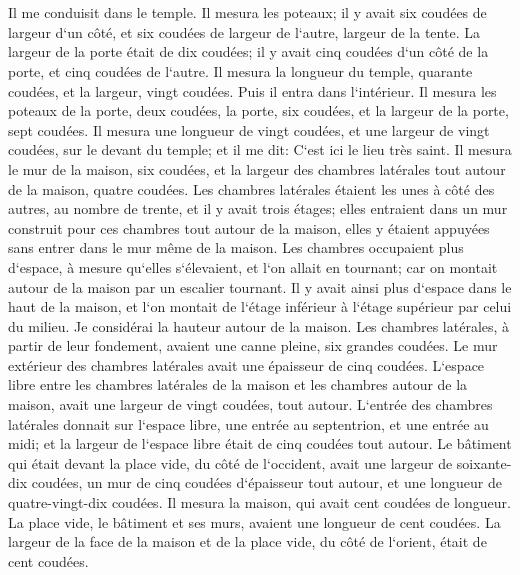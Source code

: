 \chapter{}

\verse Il me conduisit dans le temple. Il mesura les poteaux; il y avait six coudées de largeur d`un côté, et six coudées de largeur de l`autre, largeur de la tente. 
\verse La largeur de la porte était de dix coudées; il y avait cinq coudées d`un côté de la porte, et cinq coudées de l`autre. Il mesura la longueur du temple, quarante coudées, et la largeur, vingt coudées. 
\verse Puis il entra dans l`intérieur. Il mesura les poteaux de la porte, deux coudées, la porte, six coudées, et la largeur de la porte, sept coudées. 
\verse Il mesura une longueur de vingt coudées, et une largeur de vingt coudées, sur le devant du temple; et il me dit: C`est ici le lieu très saint. 
\verse Il mesura le mur de la maison, six coudées, et la largeur des chambres latérales tout autour de la maison, quatre coudées. 
\verse Les chambres latérales étaient les unes à côté des autres, au nombre de trente, et il y avait trois étages; elles entraient dans un mur construit pour ces chambres tout autour de la maison, elles y étaient appuyées sans entrer dans le mur même de la maison. 
\verse Les chambres occupaient plus d`espace, à mesure qu`elles s`élevaient, et l`on allait en tournant; car on montait autour de la maison par un escalier tournant. Il y avait ainsi plus d`espace dans le haut de la maison, et l`on montait de l`étage inférieur à l`étage supérieur par celui du milieu. 
\verse Je considérai la hauteur autour de la maison. Les chambres latérales, à partir de leur fondement, avaient une canne pleine, six grandes coudées. 
\verse Le mur extérieur des chambres latérales avait une épaisseur de cinq coudées. L`espace libre entre les chambres latérales de la maison 
\verse et les chambres autour de la maison, avait une largeur de vingt coudées, tout autour. 
\verse L`entrée des chambres latérales donnait sur l`espace libre, une entrée au septentrion, et une entrée au midi; et la largeur de l`espace libre était de cinq coudées tout autour. 
\verse Le bâtiment qui était devant la place vide, du côté de l`occident, avait une largeur de soixante-dix coudées, un mur de cinq coudées d`épaisseur tout autour, et une longueur de quatre-vingt-dix coudées. 
\verse Il mesura la maison, qui avait cent coudées de longueur. La place vide, le bâtiment et ses murs, avaient une longueur de cent coudées. 
\verse La largeur de la face de la maison et de la place vide, du côté de l`orient, était de cent coudées. 
